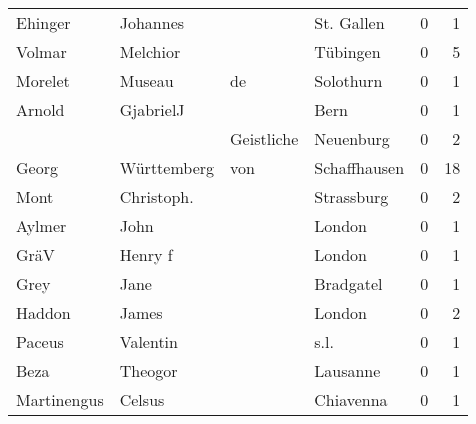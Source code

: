 \begin{center}
\begin{tiny}
\begin{longtabu}{llllrr}
                  Ehinger &                           Johannes &             &                                  St. Gallen &          0 &         1 \\
                   Volmar &                           Melchior &             &                                    Tübingen &          0 &         5 \\
                  Morelet &                             Museau &          de &                                   Solothurn &          0 &         1 \\
                   Arnold &                          GjabrielJ &             &                                        Bern &          0 &         1 \\
                          &                                    &  Geistliche &                                   Neuenburg &          0 &         2 \\
                    Georg &                        Württemberg &         von &                                Schaffhausen &          0 &        18 \\
                     Mont &                         Christoph. &             &                                  Strassburg &          0 &         2 \\
                   Aylmer &                               John &             &                                      London &          0 &         1 \\
                     GräV &                            Henry f &             &                                      London &          0 &         1 \\
                     Grey &                               Jane &             &                                   Bradgatel &          0 &         1 \\
                   Haddon &                              James &             &                                      London &          0 &         2 \\
                   Paceus &                           Valentin &             &                                        s.l. &          0 &         1 \\
                     Beza &                            Theogor &             &                                    Lausanne &          0 &         1 \\
              Martinengus &                             Celsus &             &                                   Chiavenna &          0 &         1 \\

\end{longtabu}
\end{tiny}
\end{center}
